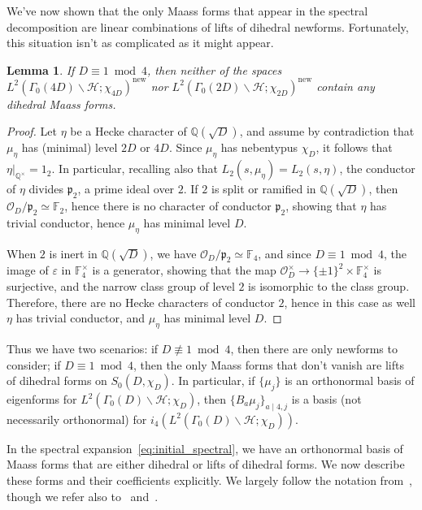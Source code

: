 \documentclass[11pt,reqno,oneside]{amsart}
\theoremstyle{plain}
\newtheorem{lemma}[theorem]{Lemma}
\theoremstyle{definition}
\DeclareMathOperator{\new}{new}
\newcommand{\F}{\mathbb{F}}
\newcommand{\Q}{\mathbb{Q}}
\newcommand{\calH}{\mathcal{H}}
\newcommand{\calO}{\mathcal{O}}
\newcommand{\frakp}{\mathfrak{p}}
\newcommand{\Szero}[2]{L^2(\Gamma_0(#1)\backslash\mathcal{H}; #2)}
\begin{document}
We've now shown that the only Maass forms that appear in the spectral
decomposition are linear combinations of lifts of dihedral newforms.
Fortunately, this situation isn't as complicated as it might appear.

\begin{lemma}\label{lem:onlysd}
  If $D \equiv 1 \bmod 4$, then neither of the spaces $\Szero{4D}{\chi_{4D}}^{\new}$ nor
  $\Szero{2D}{\chi_{2D}}^{\new}$ contain any dihedral Maass forms.
\end{lemma}

\begin{proof}
  Let $\eta$ be a Hecke character of $\Q(\sqrt{D})$, and assume by contradiction that $\mu_{\eta}$ has (minimal) level $2D$ or $4D$.
  Since $\mu_{\eta}$ has nebentypus $\chi_{D}$, it follows that $\eta \vert_{\Q^{\times}} = 1_{2}$. In particular, recalling also that $L_2(s, \mu_{\eta}) = L_2(s, \eta)$, the conductor of $\eta$ divides $\frakp_2$, a prime ideal over $2$.
  If $2$ is split or ramified in $\Q(\sqrt{D})$, then $\calO_D / \frakp_2 \simeq \F_2$, hence there is no character of conductor $\frakp_2$, showing that $\eta$ has trivial conductor, hence $\mu_{\eta}$ has minimal level $D$.

  When $2$ is inert in $\Q(\sqrt{D})$, we have $\calO_D / \frakp_2 \simeq \F_4$, and since $D \equiv 1 \bmod 4$, the image of $\varepsilon$ in $\F_4^{\times}$ is a generator, showing that the map $\calO_D^{\times} \to \{ \pm 1\}^2 \times \F_4^{\times}$ is surjective, and the narrow class group of level $2$ is isomorphic to the class group. Therefore, there are no Hecke characters of conductor $2$, hence in this case as well $\eta$ has trivial conductor, and $\mu_{\eta}$ has minimal level $D$.
\end{proof}

Thus we have two scenarios: if $D \not \equiv 1 \bmod 4$, then there are only
newforms to consider; if $D \equiv 1 \bmod 4$, then the only Maass forms that
don't vanish are lifts of dihedral forms on $S_0(D, \chi_D)$.
In particular, if $\{\mu_j\}$ is an orthonormal basis of eigenforms for
$L^2(\Gamma_0(D) \backslash \calH; \chi_D)$, then $\{ B_a \mu_j \}_{a \mid 4,j}$
is a basis (not necessarily orthonormal) for
$i_4(L^2(\Gamma_0(D) \backslash \calH; \chi_D))$.

In the spectral expansion~\eqref{eq:initial_spectral}, we have an orthonormal
basis of Maass forms that are either dihedral or lifts of dihedral forms.
We now describe these forms and their coefficients explicitly. We largely follow the notation from~\cite[\S1.7,\S1.9]{bump1998automorphic},
though we refer also to~\cite{lang1994algebraic}
and~\cite{molin2022computing}.
\end{document}
